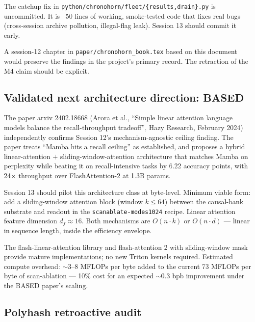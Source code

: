 The catchup fix in \texttt{python/chronohorn/fleet/\{results,drain\}.py} is uncommitted. It is ~50 lines of working, smoke-tested code that fixes real bugs (cross-session archive pollution, illegal-flag leak). Session 13 should commit it early.

A session-12 chapter in \texttt{paper/chronohorn\_book.tex} based on this document would preserve the findings in the project's primary record. The retraction of the M4 claim should be explicit.

\subsection{Validated next architecture direction: BASED}

The paper arxiv 2402.18668 (Arora et al., ``Simple linear attention language models balance the recall-throughput tradeoff'', Hazy Research, February 2024) independently confirms Session 12's mechanism-agnostic ceiling finding. The paper treats ``Mamba hits a recall ceiling'' as established, and proposes a hybrid linear-attention $+$ sliding-window-attention architecture that matches Mamba on perplexity while beating it on recall-intensive tasks by 6.22 accuracy points, with 24$\times$ throughput over FlashAttention-2 at 1.3B params.

Session 13 should pilot this architecture class at byte-level. Minimum viable form: add a sliding-window attention block (window $k \leq 64$) between the causal-bank substrate and readout in the \texttt{scanablate-modes1024} recipe. Linear attention feature dimension $d_f \approx 16$. Both mechanisms are $O(n \cdot k)$ or $O(n \cdot d)$ --- linear in sequence length, inside the efficiency envelope.

The flash-linear-attention library and flash-attention 2 with sliding-window mask provide mature implementations; no new Triton kernels required. Estimated compute overhead: $\sim$3--8 MFLOPs per byte added to the current 73 MFLOPs per byte of scan-ablation --- 10\% cost for an expected $\sim 0.3$ bpb improvement under the BASED paper's scaling.

\subsection{Polyhash retroactive audit}


